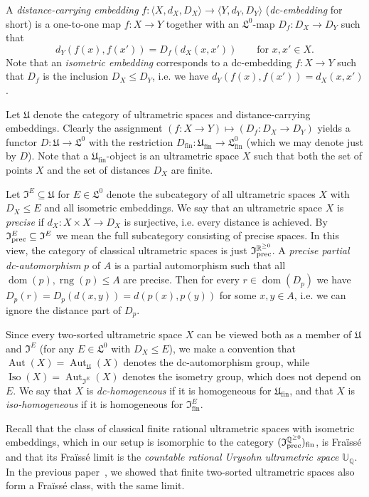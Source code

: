 \documentclass[10pt,a4paper]{article}
\theoremstyle{definition}
\theoremstyle{remark}
\newcommand \seq [1]{\langle #1 \rangle}
\newcommand \maps {\colon} %
\newcommand \dom {\operatorname{dom}}
\newcommand \rng {\operatorname{rng}}
\newcommand \subs {\subseteq}
\newcommand \Q {\mathbb{Q}}
\newcommand \R {\mathbb{R}}
\newcommand \Qpos {\Q^{\geq 0}}
\newcommand \Rpos {\R^{\geq 0}}
\newcommand \U {\mathbb{U}}
\newcommand \fin {{\operatorname{fin}}}
\newcommand \Lin {\mathfrak{L}}
\newcommand \Ult {\mathfrak{U}}
\newcommand \UltIso {\mathfrak{I}}
\newcommand \Aut {\operatorname{Aut}}
\newcommand \Iso {\operatorname{Iso}}
\begin{document}
A \emph{distance-carrying embedding} $f\maps \seq{X, d_X, D_X} \to \seq{Y, d_Y, D_Y}$ (\emph{dc-embedding} for short) is a one-to-one map $f\maps X \to Y$ together with an $\Lin^0$-map $D_f\maps D_X \to D_Y$ such that
\[
    d_Y(f(x), f(x')) = D_f(d_X(x, x')) \qquad \text{for } x, x' \in X.
\]
Note that an \emph{isometric embedding} corresponds to a dc-embedding $f\maps X \to Y$ such that $D_f$ is the inclusion $D_X \leq D_Y$, i.e. we have $d_Y(f(x), f(x')) = d_X(x, x')$.



Let $\Ult$ denote the category of ultrametric spaces and distance-carrying embeddings.
Clearly the assignment $(f\maps X \to Y) \mapsto (D_f\maps D_X \to D_Y)$ yields a functor $D\maps \Ult \to \Lin^0$ with the restriction $D_\fin \maps \Ult_\fin \to \Lin^0_\fin$ (which we may denote just by $D$).
Note that a $\Ult_\fin$-object is an ultrametric space $X$ such that both the set of points $X$ and the set of distances $D_X$ are finite.

Let $\UltIso^E \subs \Ult$ for $E \in \Lin^0$ denote the subcategory of all ultrametric spaces $X$ with $D_X \leq E$ and all isometric embeddings.
We say that an ultrametric space $X$ is \emph{precise} if $d_X\maps X \times X \to D_X$ is surjective, i.e. every distance is achieved.
By $\UltIso^E_{\rm prec} \subs \UltIso^E$
  we mean the full subcategory consisting of precise spaces. 
In this view, the category of classical ultrametric spaces is just $\UltIso^{\Rpos}_{\rm prec}$.
A {\it precise partial dc-automorphism} $p$ of $A$ is a  partial automorphism such that all $\dom(p), \rng(p) \leq A$ are precise.
Then for every $r \in \dom(D_p)$ we have $D_p(r) = D_p(d(x, y)) = d(p(x), p(y))$ for some $x, y \in A$, i.e.  we can ignore the distance part of $D_p$.


Since every two-sorted ultrametric space $X$ can be viewed both as a member of $\Ult$ and $\UltIso^E$ (for any $E \in \Lin^0$ with $D_X \leq E$), we make a convention that $\Aut(X) = \Aut_{\Ult}(X)$ denotes the dc-automorphism group, while $\Iso(X) = \Aut_{\UltIso^E}(X)$ denotes the isometry group, which does not depend on $E$.
We say that $X$ is \emph{dc-homogeneous} if it is homogeneous for $\Ult_\fin$, and that $X$ is \emph{iso-homogeneous} if it is homogeneous for $\UltIso^E_\fin$.

Recall that the class of classical finite rational ultrametric spaces with isometric embeddings, which in our setup is isomorphic to the category $(\UltIso^{\Qpos}_{\rm prec})_\fin$, is Fraïssé and that its Fraïssé limit is the \emph{countable rational Urysohn ultrametric space} $\U_\Q$.
In the previous paper~\cite{paper1}, we showed that finite two-sorted ultrametric spaces also  form a Fraïssé class, with the same limit.
\end{document}
